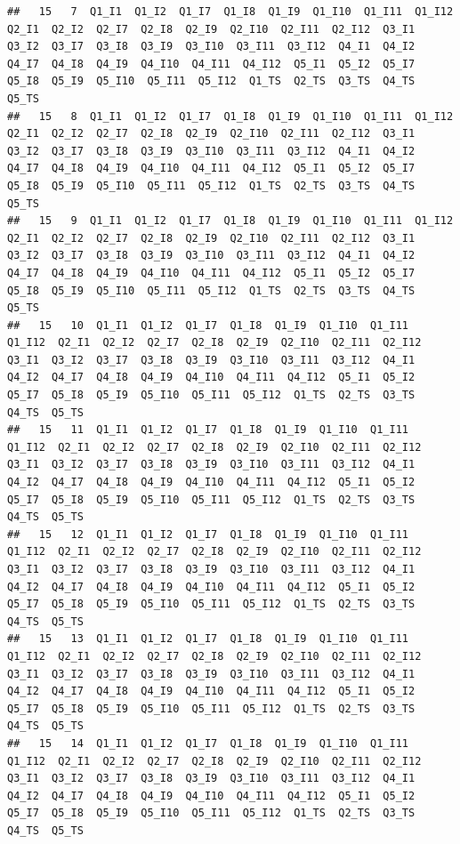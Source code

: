 \documentclass[]{book}
\begin{document}
\begin{verbatim}
##   15   7  Q1_I1  Q1_I2  Q1_I7  Q1_I8  Q1_I9  Q1_I10  Q1_I11  Q1_I12  Q2_I1  Q2_I2  Q2_I7  Q2_I8  Q2_I9  Q2_I10  Q2_I11  Q2_I12  Q3_I1  Q3_I2  Q3_I7  Q3_I8  Q3_I9  Q3_I10  Q3_I11  Q3_I12  Q4_I1  Q4_I2  Q4_I7  Q4_I8  Q4_I9  Q4_I10  Q4_I11  Q4_I12  Q5_I1  Q5_I2  Q5_I7  Q5_I8  Q5_I9  Q5_I10  Q5_I11  Q5_I12  Q1_TS  Q2_TS  Q3_TS  Q4_TS  Q5_TS
##   15   8  Q1_I1  Q1_I2  Q1_I7  Q1_I8  Q1_I9  Q1_I10  Q1_I11  Q1_I12  Q2_I1  Q2_I2  Q2_I7  Q2_I8  Q2_I9  Q2_I10  Q2_I11  Q2_I12  Q3_I1  Q3_I2  Q3_I7  Q3_I8  Q3_I9  Q3_I10  Q3_I11  Q3_I12  Q4_I1  Q4_I2  Q4_I7  Q4_I8  Q4_I9  Q4_I10  Q4_I11  Q4_I12  Q5_I1  Q5_I2  Q5_I7  Q5_I8  Q5_I9  Q5_I10  Q5_I11  Q5_I12  Q1_TS  Q2_TS  Q3_TS  Q4_TS  Q5_TS
##   15   9  Q1_I1  Q1_I2  Q1_I7  Q1_I8  Q1_I9  Q1_I10  Q1_I11  Q1_I12  Q2_I1  Q2_I2  Q2_I7  Q2_I8  Q2_I9  Q2_I10  Q2_I11  Q2_I12  Q3_I1  Q3_I2  Q3_I7  Q3_I8  Q3_I9  Q3_I10  Q3_I11  Q3_I12  Q4_I1  Q4_I2  Q4_I7  Q4_I8  Q4_I9  Q4_I10  Q4_I11  Q4_I12  Q5_I1  Q5_I2  Q5_I7  Q5_I8  Q5_I9  Q5_I10  Q5_I11  Q5_I12  Q1_TS  Q2_TS  Q3_TS  Q4_TS  Q5_TS
##   15   10  Q1_I1  Q1_I2  Q1_I7  Q1_I8  Q1_I9  Q1_I10  Q1_I11  Q1_I12  Q2_I1  Q2_I2  Q2_I7  Q2_I8  Q2_I9  Q2_I10  Q2_I11  Q2_I12  Q3_I1  Q3_I2  Q3_I7  Q3_I8  Q3_I9  Q3_I10  Q3_I11  Q3_I12  Q4_I1  Q4_I2  Q4_I7  Q4_I8  Q4_I9  Q4_I10  Q4_I11  Q4_I12  Q5_I1  Q5_I2  Q5_I7  Q5_I8  Q5_I9  Q5_I10  Q5_I11  Q5_I12  Q1_TS  Q2_TS  Q3_TS  Q4_TS  Q5_TS
##   15   11  Q1_I1  Q1_I2  Q1_I7  Q1_I8  Q1_I9  Q1_I10  Q1_I11  Q1_I12  Q2_I1  Q2_I2  Q2_I7  Q2_I8  Q2_I9  Q2_I10  Q2_I11  Q2_I12  Q3_I1  Q3_I2  Q3_I7  Q3_I8  Q3_I9  Q3_I10  Q3_I11  Q3_I12  Q4_I1  Q4_I2  Q4_I7  Q4_I8  Q4_I9  Q4_I10  Q4_I11  Q4_I12  Q5_I1  Q5_I2  Q5_I7  Q5_I8  Q5_I9  Q5_I10  Q5_I11  Q5_I12  Q1_TS  Q2_TS  Q3_TS  Q4_TS  Q5_TS
##   15   12  Q1_I1  Q1_I2  Q1_I7  Q1_I8  Q1_I9  Q1_I10  Q1_I11  Q1_I12  Q2_I1  Q2_I2  Q2_I7  Q2_I8  Q2_I9  Q2_I10  Q2_I11  Q2_I12  Q3_I1  Q3_I2  Q3_I7  Q3_I8  Q3_I9  Q3_I10  Q3_I11  Q3_I12  Q4_I1  Q4_I2  Q4_I7  Q4_I8  Q4_I9  Q4_I10  Q4_I11  Q4_I12  Q5_I1  Q5_I2  Q5_I7  Q5_I8  Q5_I9  Q5_I10  Q5_I11  Q5_I12  Q1_TS  Q2_TS  Q3_TS  Q4_TS  Q5_TS
##   15   13  Q1_I1  Q1_I2  Q1_I7  Q1_I8  Q1_I9  Q1_I10  Q1_I11  Q1_I12  Q2_I1  Q2_I2  Q2_I7  Q2_I8  Q2_I9  Q2_I10  Q2_I11  Q2_I12  Q3_I1  Q3_I2  Q3_I7  Q3_I8  Q3_I9  Q3_I10  Q3_I11  Q3_I12  Q4_I1  Q4_I2  Q4_I7  Q4_I8  Q4_I9  Q4_I10  Q4_I11  Q4_I12  Q5_I1  Q5_I2  Q5_I7  Q5_I8  Q5_I9  Q5_I10  Q5_I11  Q5_I12  Q1_TS  Q2_TS  Q3_TS  Q4_TS  Q5_TS
##   15   14  Q1_I1  Q1_I2  Q1_I7  Q1_I8  Q1_I9  Q1_I10  Q1_I11  Q1_I12  Q2_I1  Q2_I2  Q2_I7  Q2_I8  Q2_I9  Q2_I10  Q2_I11  Q2_I12  Q3_I1  Q3_I2  Q3_I7  Q3_I8  Q3_I9  Q3_I10  Q3_I11  Q3_I12  Q4_I1  Q4_I2  Q4_I7  Q4_I8  Q4_I9  Q4_I10  Q4_I11  Q4_I12  Q5_I1  Q5_I2  Q5_I7  Q5_I8  Q5_I9  Q5_I10  Q5_I11  Q5_I12  Q1_TS  Q2_TS  Q3_TS  Q4_TS  Q5_TS

\end{verbatim}
\end{document}
